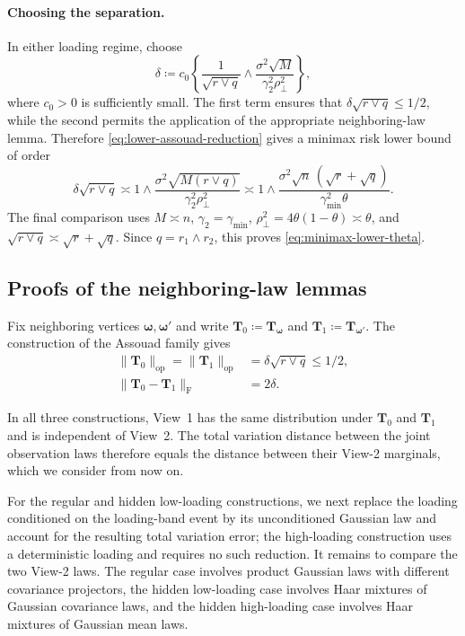 \documentclass[11pt]{article}
\begin{document}
\paragraph{Choosing the separation.}
In either loading regime, choose
\[
  \delta
  \coloneqq
  c_0
  \left\{
    \frac1{\sqrt{r\vee q}}
    \wedge
    \frac{\sigma^2\sqrt M}
         {\gamma_2^2\rho_\perp^2}
  \right\},
\]
where $c_0>0$ is sufficiently small.  The first term ensures that
$\delta\sqrt{r\vee q}\le1/2$, while the second permits the application of
the appropriate neighboring-law lemma.  Therefore
\cref{eq:lower-assouad-reduction} gives a minimax risk lower bound of order
\[
  \delta\sqrt{r\vee q}
  \asymp
  1\wedge
  \frac{
    \sigma^2\sqrt{M(r\vee q)}
  }{
    \gamma_2^2\rho_\perp^2
  }
  \asymp
  1\wedge
  \frac{
    \sigma^2\sqrt n\,(\sqrt r+\sqrt q)
  }{
    \gamma_{\min}^2\theta
  }.
\]
The final comparison uses
$M\asymp n$, $\gamma_2=\gamma_{\min}$,
$\rho_\perp^2=4\theta(1-\theta)\asymp\theta$, and
$\sqrt{r\vee q}\asymp\sqrt r+\sqrt q$.  Since
$q=r_1\wedge r_2$, this proves \cref{eq:minimax-lower-theta}.


\subsection{Proofs of the neighboring-law lemmas}

Fix neighboring vertices $\bm\omega,\bm\omega'$ and write
$\bm T_0\coloneqq\bm T_{\bm\omega}$ and
$\bm T_1\coloneqq\bm T_{\bm\omega'}$. 
The construction of the Assouad family
gives
\begin{align*}
\|\bm T_0\|_{\mathrm{op}}=\|\bm T_1\|_{\mathrm{op}}
&=\delta\sqrt{r\vee q}\le1/2,\\
\|\bm T_0-\bm T_1\|_{\mathrm F}&=2\delta.
\end{align*}

In all three constructions, View~1 has the same distribution under $\bm T_0$ and $\bm T_1$ and is independent of View~2.  The total variation distance between the joint observation laws therefore equals the distance between their View-2 marginals, which we consider from now on. 

For the regular and hidden low-loading constructions, we next replace the loading conditioned on the loading-band event by its unconditioned Gaussian law and account for the resulting total variation error; the high-loading construction uses a deterministic loading and requires no such reduction.  It remains to compare the two View-2 laws.  The regular case involves product Gaussian laws with different covariance projectors, the hidden low-loading case involves Haar mixtures of Gaussian covariance laws, and the hidden high-loading case involves Haar mixtures of Gaussian mean laws.
\end{document}

